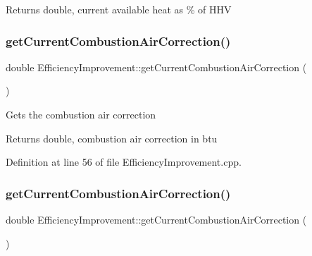 \begin{DoxyReturn}{Returns}
double, current available heat as \% of H\+HV 
\end{DoxyReturn}
\mbox{\label{class_efficiency_improvement_af50c396ac8ee18f594d6e8b8814f056a}} 
\subsubsection{\texorpdfstring{get\+Current\+Combustion\+Air\+Correction()}{getCurrentCombustionAirCorrection()}\hspace{0.1cm}{\footnotesize\ttfamily [1/3]}}
{\footnotesize\ttfamily double Efficiency\+Improvement\+::get\+Current\+Combustion\+Air\+Correction (\begin{DoxyParamCaption}{ }\end{DoxyParamCaption})}

Gets the combustion air correction

\begin{DoxyReturn}{Returns}
double, combustion air correction in btu 
\end{DoxyReturn}


Definition at line 56 of file Efficiency\+Improvement.\+cpp.

\mbox{\label{class_efficiency_improvement_af50c396ac8ee18f594d6e8b8814f056a}} 
\subsubsection{\texorpdfstring{get\+Current\+Combustion\+Air\+Correction()}{getCurrentCombustionAirCorrection()}\hspace{0.1cm}{\footnotesize\ttfamily [2/3]}}
{\footnotesize\ttfamily double Efficiency\+Improvement\+::get\+Current\+Combustion\+Air\+Correction (\begin{DoxyParamCaption}{ }\end{DoxyParamCaption})}

